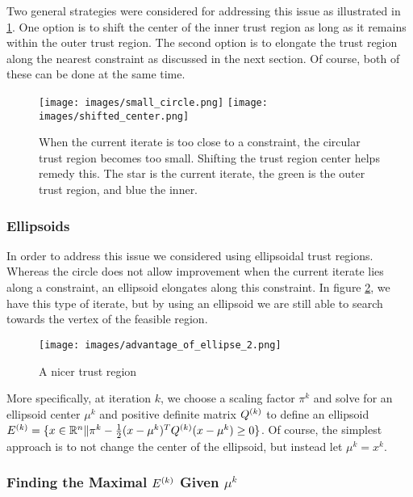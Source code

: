 Two general strategies were considered for addressing this issue as illustrated in \cref{options_basis}.
One option is to shift the center of the inner trust region as long as it remains within the outer trust region.
The second option is to elongate the trust region along the nearest constraint as discussed in the next section.
Of course, both of these can be done at the same time.


\begin{figure}[h]
    \centering
    \texttt{[image: images/small\_circle.png]}
    \texttt{[image: images/shifted\_center.png]}
    \caption{When the current iterate is too close to a constraint, the circular trust region becomes too small. Shifting the trust region center helps remedy this. The star is the current iterate, the green is the outer trust region, and blue the inner.}
    \label{options_basis}
\end{figure}

\subsubsection{Ellipsoids}

In order to address this issue we considered using ellipsoidal trust regions.
Whereas the circle does not allow improvement when the current iterate lies along a constraint, an ellipsoid elongates along this constraint.
In figure \cref{ellipse_adv}, we have this type of iterate, but by using an ellipsoid we are still able to search towards the vertex of the feasible region.
\begin{figure}[h]
    \centering
    \texttt{[image: images/advantage\_of\_ellipse\_2.png]}
    \caption{A nicer trust region}
    \label{ellipse_adv}
\end{figure}


More specifically, at iteration $k$, we choose a scaling factor $\pi^k$ and solve for an ellipsoid center $\mu^k$ and positive definite matrix ${Q^{(k)}}$ to define an ellipsoid
$ {E^{(k)}} = \{x \in \mathbb R^n \| \pi^k - \frac 1 2 (x - \mu^{k})^T{Q^{(k)}}(x - \mu^{k}) \ge 0 \}$.
Of course, the simplest approach is to not change the center of the ellipsoid, but instead let $\mu^k = x^k$.


\subsubsection{Finding the Maximal $ {E^{(k)}} $ Given $\mu^k$}

\label{ellipse_optimization}


